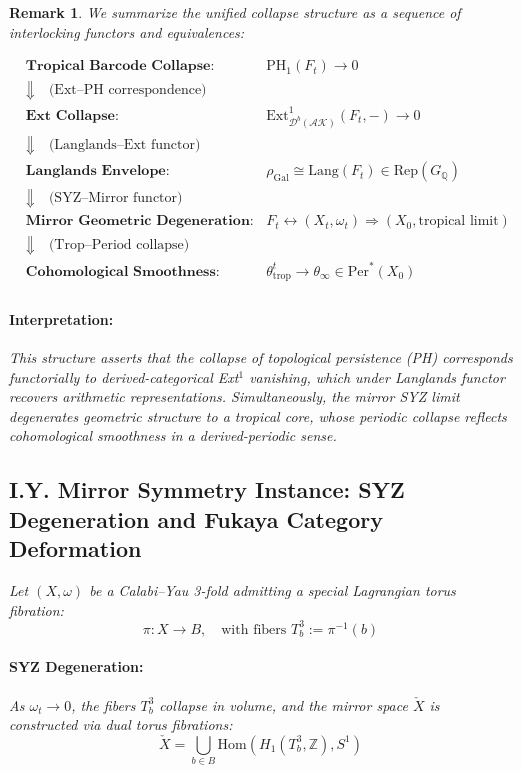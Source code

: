 \documentclass[11pt]{article}
\newtheorem{remark}[theorem]{Remark}
\begin{document}
\begin{remark}
We summarize the unified collapse structure as a sequence of interlocking functors and equivalences:

\[
\begin{aligned}
&\textbf{Tropical Barcode Collapse:} \quad & \mathrm{PH}_1(F_t) \longrightarrow 0 \\
&\Downarrow \quad \text{(Ext–PH correspondence)} \\
&\textbf{Ext Collapse:} \quad & \mathrm{Ext}^1_{\mathcal{D}^b(\mathcal{AK})}(F_t, -) \longrightarrow 0 \\
&\Downarrow \quad \text{(Langlands–Ext functor)} \\
&\textbf{Langlands Envelope:} \quad & \rho_{\mathrm{Gal}} \cong \text{Lang}(F_t) \in \mathrm{Rep}(G_{\mathbb{Q}}) \\
&\Downarrow \quad \text{(SYZ–Mirror functor)} \\
&\textbf{Mirror Geometric Degeneration:} \quad & F_t \leftrightarrow (X_t, \omega_t) \Rightarrow (X_0, \text{tropical limit}) \\
&\Downarrow \quad \text{(Trop–Period collapse)} \\
&\textbf{Cohomological Smoothness:} \quad & \theta_{\mathrm{trop}}^t \longrightarrow \theta_{\infty} \in \mathrm{Per}^*(X_0) \\
\end{aligned}
\]

\paragraph{Interpretation:}
This structure asserts that the collapse of topological persistence (PH) corresponds functorially to derived-categorical Ext$^1$ vanishing, which under Langlands functor recovers arithmetic representations.  
Simultaneously, the mirror SYZ limit degenerates geometric structure to a tropical core, whose periodic collapse reflects cohomological smoothness in a derived-periodic sense.

\subsection*{I.Y. Mirror Symmetry Instance: SYZ Degeneration and Fukaya Category Deformation}

Let $(X, \omega)$ be a Calabi–Yau 3-fold admitting a special Lagrangian torus fibration:
\[
\pi : X \rightarrow B, \quad \text{with fibers } T^3_b := \pi^{-1}(b)
\]

\paragraph{SYZ Degeneration:}
As $\omega_t \rightarrow 0$, the fibers $T^3_b$ collapse in volume, and the mirror space $\check{X}$ is constructed via dual torus fibrations:
\[
\check{X} = \bigcup_{b \in B} \mathrm{Hom}(H_1(T^3_b, \mathbb{Z}), S^1)
\]


\end{remark}
\end{document}
